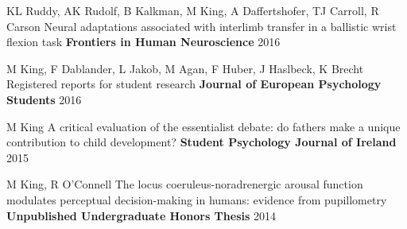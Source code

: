 \begin{cventries}
  \cventry
    {KL Ruddy, AK Rudolf, B Kalkman, M King, A Daffertshofer, TJ Carroll, R Carson} %
    {Neural adaptations associated with interlimb transfer in a ballistic wrist flexion task} %
    {\textbf{Frontiers in Human Neuroscience}} %
    {2016} %
    {}
    
  \cventry
    {M King, F Dablander, L Jakob, M Agan, F Huber, J Haslbeck, K Brecht} %
    {Registered reports for student research} %
    {\textbf{Journal of European Psychology Students}} %
    {2016} %
    {}
    
  \cventry
    {M King} %
    {A critical evaluation of the essentialist debate: do fathers make a unique contribution to child development?} %
    {\textbf{Student Psychology Journal of Ireland}} %
    {2015} %
    {}
    
  \cventry
    {M King, R O'Connell} %
    {The locus coeruleus-noradrenergic arousal function modulates perceptual decision-making in humans: evidence from pupillometry} %
    {\textbf{Unpublished Undergraduate Honors Thesis}} %
    {2014} %
    {}

\end{cventries}